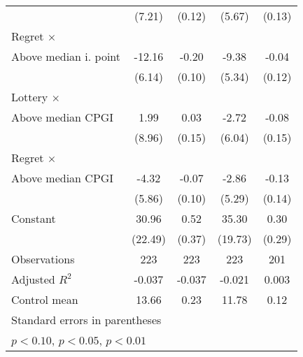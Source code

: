 \begin{table}[htbp]
\begin{tabular}{l*{4}{c}}
                &   (7.21)         &   (0.12)         &   (5.67)         &   (0.13)         \\
\addlinespace
Regret $\times$ \\ Above median i. point&   -12.16\sym{**} &    -0.20\sym{**} &    -9.38\sym{*}  &    -0.04         \\
                &   (6.14)         &   (0.10)         &   (5.34)         &   (0.12)         \\
\addlinespace
Lottery $\times$ \\ Above median CPGI&     1.99         &     0.03         &    -2.72         &    -0.08         \\
                &   (8.96)         &   (0.15)         &   (6.04)         &   (0.15)         \\
\addlinespace
Regret $\times$ \\ Above median CPGI&    -4.32         &    -0.07         &    -2.86         &    -0.13         \\
                &   (5.86)         &   (0.10)         &   (5.29)         &   (0.14)         \\
\addlinespace
Constant        &    30.96         &     0.52         &    35.30\sym{*}  &     0.30         \\
                &  (22.49)         &   (0.37)         &  (19.73)         &   (0.29)         \\
\midrule
Observations    &      223         &      223         &      223         &      201         \\
Adjusted \(R^{2}\)&   -0.037         &   -0.037         &   -0.021         &    0.003         \\
Control mean    &    13.66         &     0.23         &    11.78         &     0.12         \\
\bottomrule
\multicolumn{5}{l}{\footnotesize Standard errors in parentheses}\\
\multicolumn{5}{l}{\footnotesize \sym{*} \(p<0.10\), \sym{**} \(p<0.05\), \sym{***} \(p<0.01\)}\\
\end{tabular}
\end{table}

